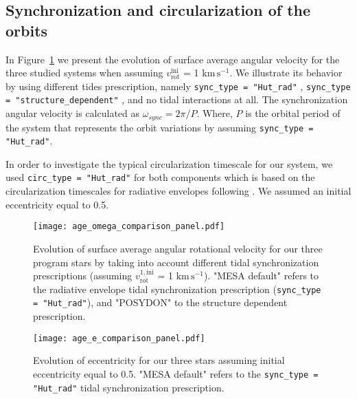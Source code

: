 \documentclass{aa}
\newcommand{\kms}{$\mathrm{km\,s^{-1}}$}
\DeclareRobustCommand{\Figref}[1]{Figure~\ref{#1}}
\begin{document}
\begin{appendix}
\section{Synchronization and circularization of the orbits}
\label{sec:angular_vel}

In \Figref{fig:v_omega} we present the evolution of surface average angular velocity for the three studied systems when assuming $v_\mathrm{rot}^\mathrm{ini}$ = 1 \kms.
We illustrate its behavior by using different tides prescription, namely \texttt{sync\_type = "Hut\_rad"} \citep{Hut_1980,Hurley_2002}, \texttt{sync\_type = "structure\_dependent"} \citep{Qin_2018}, and no tidal interactions at all.
The synchronization angular velocity is calculated as $\omega_{sync} = 2 \pi / P$. Where, $P$ is the orbital period of the system that represents the orbit variations by assuming \texttt{sync\_type = "Hut\_rad"}.


In order to investigate the typical circularization timescale for our system, we used \texttt{circ\_type = "Hut\_rad"} for both components which is based on the circularization timescales for radiative envelopes following \citet{Hurley_2002}.
We assumed an initial eccentricity equal to 0.5.


\begin{figure}[!ht]
  \centering
  \texttt{[image: age\_omega\_comparison\_panel.pdf]}
  \caption{Evolution of surface average angular rotational velocity for our
    three program stars by taking into account different tidal
    synchronization prescriptions (assuming $v_\mathrm{rot}^\mathrm{1, ini}$ = 1 \kms). "MESA default" refers to the
    radiative envelope tidal synchronization prescription (\texttt{sync\_type = "Hut\_rad"}), and "POSYDON" to the structure dependent
    prescription.}
  \label{fig:v_omega}
\end{figure}



\begin{figure}[!ht]
  \centering
  \texttt{[image: age\_e\_comparison\_panel.pdf]}
  \caption{Evolution of eccentricity for our
    three stars assuming initial eccentricity equal to 0.5. "MESA default" refers to the
    \texttt{sync\_type = "Hut\_rad"} tidal synchronization prescription.}
  \label{fig:v_ecc}
\end{figure}

\end{appendix}
\end{document}

